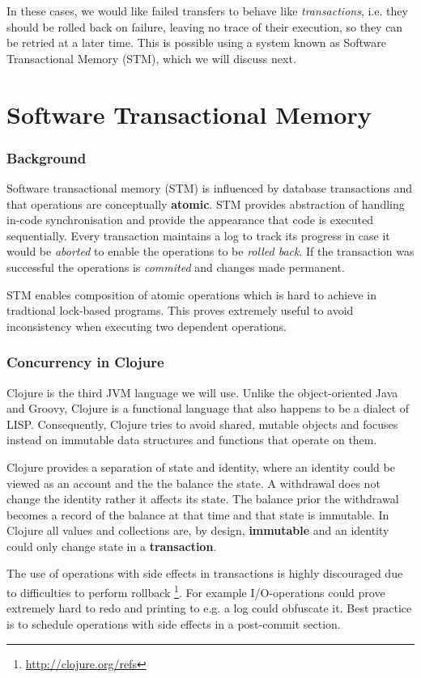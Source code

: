 \documentclass[a4paper,12pt]{kth-mag}
\begin{document}
In these cases, we would like failed transfers to behave like \textit{transactions}, i.e. they should be rolled back on failure, leaving no trace of their execution, so they can be retried at a later time. This is possible using a system known as Software Transactional Memory (STM), which we will discuss next.

\part{ Software Transactional Memory}

\section{Background}
Software transactional memory (STM) is influenced by database transactions and that operations are conceptually \textbf{atomic}. STM provides abstraction of handling in-code synchronisation and provide the appearance that code is executed sequentially. Every transaction maintains a log to track its progress in case it would be \textit{aborted} to enable the operations to be \textit{rolled back}. If the transaction was successful the operations is \textit{commited} and changes made permanent.

STM enables composition of atomic operations\cite{cmt} which is hard to achieve in tradtional lock-based programs. This proves extremely useful to avoid inconsistency when executing two dependent operations.

\section{Concurrency in Clojure}
Clojure is the third JVM language we will use. Unlike the object-oriented Java and Groovy, Clojure is a functional language that also happens to be a dialect of LISP.  Consequently, Clojure tries to avoid shared, mutable objects and focuses instead on immutable data structures and functions that operate on them.

Clojure provides a separation of state and identity, where an identity could be viewed as an account and the the balance the state. A withdrawal does not change the identity rather it affects its state. The balance prior the withdrawal becomes a record of the balance at that time and that state is immutable. In Clojure all values and collections are, by design, \textbf{immutable} and an identity could only change state in a \textbf{transaction}.

The use of operations with side effects in transactions is highly discouraged due to difficulties to perform rollback \footnote{\url{http://clojure.org/refs}}. For example I/O-operations could prove extremely hard to redo and printing to e.g. a log could obfuscate it. Best practice is to schedule operations with side effects in a post-commit section.
\end{document}
